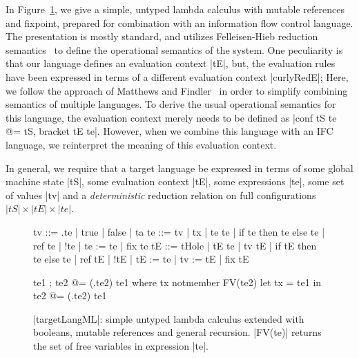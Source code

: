 In Figure~\ref{fig:ml}, we give a simple, untyped lambda calculus with
mutable references and fixpoint, prepared for combination with an
information flow control language.  The presentation is mostly standard, and utilizes Felleisen-Hieb reduction
semantics~\cite{Felleisen:1992:RRS:136293.136297} to define the
operational semantics of the system.  One peculiarity is that our language
defines an evaluation context |tE|, but, the evaluation rules have been
expressed in terms of a different evaluation context |curlyRedE|;
Here, we follow the approach of Matthews and
Findler~\cite{Matthews:2007:OSM:1190216.1190220} in order to simplify combining
semantics of multiple languages. 
To derive the usual operational semantics for this language, the evaluation
context merely needs to be defined as |conf tS te @= tS, bracket tE te|.
However, when we combine this language with an IFC language, we
reinterpret the meaning of this evaluation context.

In general, we require that a target language be expressed in terms
of some global machine state |tS|, some evaluation context |tE|,
some expressions |te|, some set of values |tv| and a \emph{deterministic}
reduction relation on full configurations $|tS| \times |tE| \times |te|$.

\begin{figure}
\begin{code}
tv   ::= \tx.te | true | false | ta
te   ::= tv | tx | te te | if te then te else te
       | ref te | !te | te := te | fix te
tE   ::= tHole | tE te | tv tE | if tE then te else te
       | ref tE | !tE | tE := te | tv := tE | fix tE

te1 ; te2            @= (\tx.te2) te1  where  tx notmember FV(te2)
let tx = te1 in te2  @= (\tx.te2) te1
\end{code}


\caption{|targetLangML|: simple untyped lambda calculus extended with booleans,
mutable references and general recursion. |FV(te)| returns the set of free
variables in expression |te|.}
\label{fig:ml}
\end{figure}

